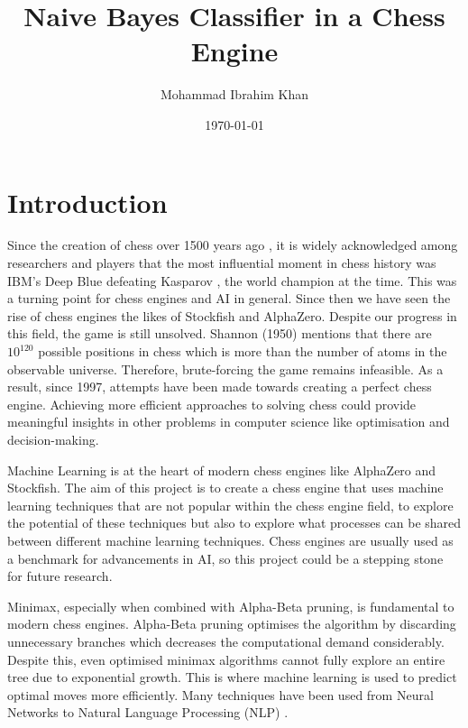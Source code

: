\documentclass[20pt]{informatics-report}
\title{Naive Bayes Classifier in a Chess Engine}
\author{Mohammad Ibrahim Khan}
\date{\today}
\begin{document}
\createFrontMatter
\onehalfspacing
\tableofcontents
\doublespacing


\chapter{Introduction}


Since the creation of chess over 1500 years ago \cite{davidsonShortHistoryChess2012}, it is widely acknowledged among researchers and players that the most influential moment in chess history was IBM's Deep Blue defeating Kasparov \cite{hsuIBMsDeepBlue1999}, the world champion at the time. This was a turning point for chess engines and AI in general.
Since then we have seen the rise of chess engines the likes of Stockfish and AlphaZero. Despite our progress in this field, the game is still unsolved. Shannon (1950) mentions that there are $10^{120}$ possible positions in chess \cite{shannonXXIIProgrammingComputer1950} which is more than the number of atoms in the observable universe. Therefore, brute-forcing the game remains infeasible. As a result, since 1997, attempts have been made towards creating a perfect chess engine. Achieving more efficient approaches to solving chess could provide meaningful insights in other problems in computer science like optimisation and decision-making.

Machine Learning is at the heart of modern chess engines like AlphaZero and Stockfish.  
The aim of this project is to create a chess engine that uses machine learning techniques that are not popular within the chess engine field, to explore the potential of these techniques but also to explore what processes can be shared between different machine learning techniques.
Chess engines are usually used as a benchmark for advancements in AI, so this project could be a stepping stone for future research. 

Minimax, especially when combined with Alpha-Beta pruning, is fundamental to modern chess engines. Alpha-Beta pruning optimises the algorithm by discarding unnecessary branches which decreases the computational demand considerably. Despite this, even optimised minimax algorithms cannot fully explore an entire tree due to exponential growth. This is where machine learning is used to predict optimal moves more efficiently. Many techniques have been used from Neural Networks \cite{kleinNeuralNetworksChess2022} to Natural Language Processing (NLP) \cite{NLPinChess}. 
\end{document}
